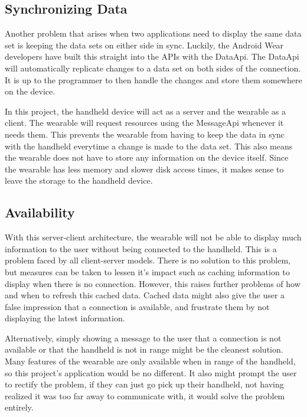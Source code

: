 \subsection{Synchronizing Data}

Another problem that arises when two applications need to display the same data
set is keeping the data sets on either side in sync. Luckily, the Android Wear
developers have built this straight into the APIs with the DataApi. The DataApi
will automatically replicate changes to a data set on both sides of the
connection. It is up to the programmer to then handle the changes and store
them somewhere on the device.

In this project, the handheld device will act as a server and the wearable as a
client. The wearable will request resources using the MessageApi whenever it
needs them. This prevents the wearable from having to keep the data in sync with
the handheld everytime a change is made to the data set. This also means the
wearable does not have to store any information on the device itself. Since the
wearable has less memory and slower disk access times, it makes sense to leave
the storage to the handheld device.

\subsection{Availability}

With this server-client architecture, the wearable will not be able to display
much information to the user without being connected to the handheld. This is
a problem faced by all client-server models. There is no solution to this
problem, but measures can be taken to lessen it's impact such as caching
information to display when there is no connection. However, this raises further
problems of how and when to refresh this cached data. Cached data might also
give the user a false impression that a connection is available, and frustrate
them by not displaying the latest information.

Alternatively, simply showing a message to the user that a connection is not
available or that the handheld is not in range might be the cleanest solution.
Many features of the wearable are only available when in range of the handheld,
so this project's application would be no different. It also might prompt the
user to rectify the problem, if they can just go pick up their handheld, not
having realized it was too far away to communicate with, it would solve the
problem entirely.

